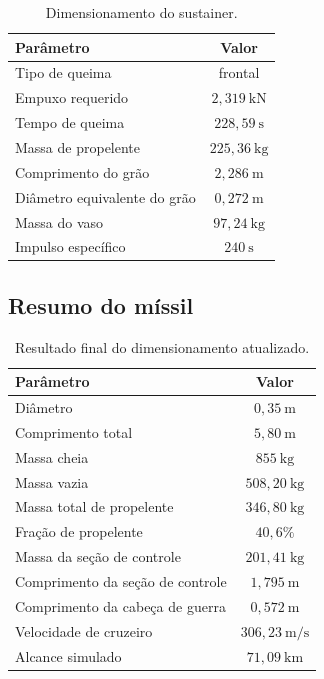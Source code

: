 \begin{table}[H]
\centering
\caption{Dimensionamento do sustainer.}
\begin{tabular}{lc}
\toprule
Parâmetro & Valor \\
\midrule
Tipo de queima & frontal \\
Empuxo requerido & \(2{,}319~\text{kN}\) \\
Tempo de queima & \(228{,}59~\text{s}\) \\
Massa de propelente & \(225{,}36~\text{kg}\) \\
Comprimento do grão & \(2{,}286~\text{m}\) \\
Diâmetro equivalente do grão & \(0{,}272~\text{m}\) \\
Massa do vaso & \(97{,}24~\text{kg}\) \\
Impulso específico & \(240~\text{s}\) \\
\bottomrule
\end{tabular}
\end{table}

\subsection{Resumo do míssil}

\begin{table}[H]
\centering
\caption{Resultado final do dimensionamento atualizado.}
\begin{tabular}{lc}
\toprule
Parâmetro & Valor \\
\midrule
Diâmetro & \(0{,}35~\text{m}\) \\
Comprimento total & \(5{,}80~\text{m}\) \\
Massa cheia & \(855~\text{kg}\) \\
Massa vazia & \(508{,}20~\text{kg}\) \\
Massa total de propelente & \(346{,}80~\text{kg}\) \\
Fração de propelente & \(40{,}6\%\) \\
Massa da seção de controle & \(201{,}41~\text{kg}\) \\
Comprimento da seção de controle & \(1{,}795~\text{m}\) \\
Comprimento da cabeça de guerra & \(0{,}572~\text{m}\) \\
Velocidade de cruzeiro & \(306{,}23~\text{m/s}\) \\
Alcance simulado & \(71{,}09~\text{km}\) \\
\bottomrule
\end{tabular}
\end{table}

